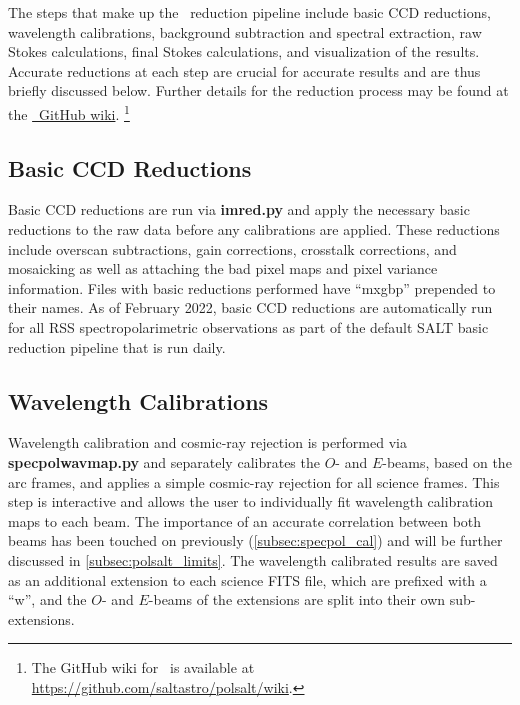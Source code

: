 The steps that make up the \polsalt\ reduction pipeline include basic \gls{CCD} reductions, wavelength calibrations, background subtraction and spectral extraction, raw Stokes calculations, final Stokes calculations, and visualization of the results. Accurate reductions at each step are crucial for accurate results and are thus briefly discussed below. Further details for the reduction process may be found at the \href{https://github.com/saltastro/polsalt/wiki}{\polsalt\ GitHub wiki}.%
\footnote{The GitHub wiki for \polsalt\ is available at \url{https://github.com/saltastro/polsalt/wiki}.}

\subsection{Basic CCD Reductions}

Basic \gls{CCD} reductions are run via \textbf{imred.py} and apply the necessary basic reductions to the raw data before any calibrations are applied. These reductions include overscan subtractions, gain corrections, crosstalk corrections, and mosaicking as well as attaching the bad pixel maps and pixel variance information. Files with basic reductions performed have ``mxgbp'' prepended to their names. As of February 2022, basic \gls{CCD} reductions are automatically run for all RSS spectropolarimetric observations as part of the default SALT basic reduction pipeline that is run daily.

\subsection{Wavelength Calibrations}

Wavelength calibration and cosmic-ray rejection is performed via \textbf{specpolwavmap.py} and separately calibrates the $O$- and $E$-beams, based on the arc frames, and applies a simple cosmic-ray rejection for all science frames. This step is interactive and allows the user to individually fit wavelength calibration maps to each beam. The importance of an accurate correlation between both beams has been touched on previously (\autoref{subsec:specpol_cal}) and will be further discussed in \autoref{subsec:polsalt_limits}. The wavelength calibrated results are saved as an additional extension to each science FITS file, which are prefixed with a ``w'', and the $O$- and $E$-beams of the extensions are split into their own sub-extensions.

